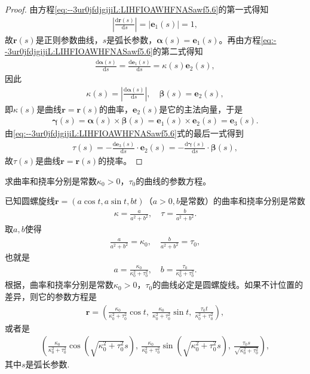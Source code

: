 \documentclass[../../main.tex]{subfiles}%
\begin{document}
\begin{proof}
由方程\eqref{eq:--3ur0jfdjgijiL:LIHFIOAWHFNASawf5.6}的第一式得知
\begin{align*}
\left|\frac{\mathrm{d}\bm{r}(s)}{\mathrm{d}s}\right| = |\bm{e}_1(s)| = 1,
\end{align*}
故$\bm{r}(s)$是正则参数曲线，$s$是弧长参数，$\bm{\alpha}(s) = \bm{e}_1(s)$。再由方程\eqref{eq:--3ur0jfdjgijiL:LIHFIOAWHFNASawf5.6}的第二式得知
\begin{align*}
\frac{\mathrm{d}\bm{\alpha}(s)}{\mathrm{d}s} = \frac{\mathrm{d}\bm{e}_1(s)}{\mathrm{d}s} = \kappa(s)\bm{e}_2(s),
\end{align*}
因此
\begin{align*}
\kappa(s) = \left|\frac{\mathrm{d}\bm{\alpha}(s)}{\mathrm{d}s}\right|,\quad \bm{\beta}(s) = \bm{e}_2(s),
\end{align*}
即$\kappa(s)$是曲线$\bm{r} = \bm{r}(s)$的曲率，$\bm{e}_2(s)$是它的主法向量，于是
\begin{align*}
\bm{\gamma}(s) = \bm{\alpha}(s) \times \bm{\beta}(s) = \bm{e}_1(s) \times \bm{e}_2(s) = \bm{e}_3(s).
\end{align*}
由\eqref{eq:--3ur0jfdjgijiL:LIHFIOAWHFNASawf5.6}式的最后一式得到
\begin{align*}
\tau(s) = -\frac{\mathrm{d}\bm{e}_3(s)}{\mathrm{d}s} \cdot \bm{e}_2(s) = -\frac{\mathrm{d}\bm{\gamma}(s)}{\mathrm{d}s} \cdot \bm{\beta}(s),
\end{align*}
故$\tau(s)$是曲线$\bm{r} = \bm{r}(s)$的挠率。
\end{proof}

\begin{example}
求曲率和挠率分别是常数$\kappa_0 > 0$，$\tau_0$的曲线的参数方程。
\end{example}
\begin{solution}
已知圆螺旋线$\bm{r} = (a\cos t,a\sin t,bt)$（$a>0,b$是常数）的曲率和挠率分别是常数
\begin{align*}
\kappa = \frac{a}{a^2 + b^2},\quad \tau = \frac{b}{a^2 + b^2}.
\end{align*}
取$a,b$使得
\begin{align*}
\frac{a}{a^2 + b^2} = \kappa_0,\quad \frac{b}{a^2 + b^2} = \tau_0,
\end{align*}
也就是
\begin{align*}
a = \frac{\kappa_0}{\kappa_0^2 + \tau_0^2},\quad b = \frac{\tau_0}{\kappa_0^2 + \tau_0^2}.
\end{align*}
根据，曲率和挠率分别是常数$\kappa_0 > 0$，$\tau_0$的曲线必定是圆螺旋线。如果不计位置的差异，则它的参数方程是
\begin{align*}
\bm{r} = \left( \frac{\kappa_0}{\kappa_0^2 + \tau_0^2}\cos t,\ \frac{\kappa_0}{\kappa_0^2 + \tau_0^2}\sin t,\ \frac{\tau_0 t}{\kappa_0^2 + \tau_0^2} \right),
\end{align*}
或者是
\begin{align*}
\left( \frac{\kappa_0}{\kappa_0^2 + \tau_0^2}\cos\left( \sqrt{\kappa_0^2 + \tau_0^2}s \right),\ \frac{\kappa_0}{\kappa_0^2 + \tau_0^2}\sin\left( \sqrt{\kappa_0^2 + \tau_0^2}s \right),\ \frac{\tau_0 s}{\sqrt{\kappa_0^2 + \tau_0^2}} \right),
\end{align*}
其中$s$是弧长参数.
\end{solution}
\end{document}

